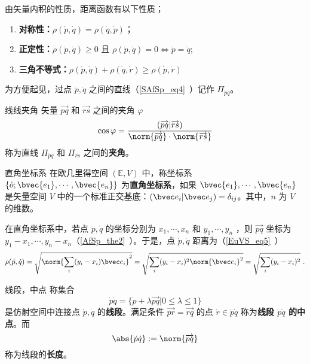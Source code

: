 由矢量内积的性质，距离函数有以下性质；
\begin{enumerate}
\item \textbf{对称性：}$\rho(\dot p,\dot q)=\rho(\dot q,\dot p)$；
\item \textbf{正定性：}$\rho(\dot p,\dot q)\geq 0$ 且 $\rho(\dot p,\dot q)= 0\Leftrightarrow\dot p=\dot q$;
\item \textbf{三角不等式：}$\rho(\dot p,\dot q)+\rho(\dot q,\dot r)\geq\rho(\dot p,\dot r)$
\end{enumerate}
为方便起见，过点 $\dot p,\dot q$ 之间的直线（\autoref{SAfSp_eq4}~）记作 $\Pi_{\dot p\dot q}$。
\begin{definition}{线线夹角}
矢量 $\overrightarrow{pq}$ 和 $\overrightarrow{rs}$ 之间的夹角 $\varphi$
\begin{equation}
\cos\varphi=\frac{(\overrightarrow{pq}|\overrightarrow{rs})}{\norm{\overrightarrow{pq}}\cdot\norm{\overrightarrow{rs}}}
\end{equation}
称为直线 $\Pi_{\dot p\dot q}$ 和 $\Pi_{\dot r\dot s}$ 之间的\textbf{夹角}。
\end{definition}
\begin{definition}{直角坐标系}
在欧几里得空间 $(\mathbb E,V)$ 中，称坐标系 $\{\dot o;\bvec{e_1},\cdots,\bvec{e_n}\}$ 为\textbf{直角坐标系}，如果 $\bvec{e_1},\cdots,\bvec{e_n}$ 是矢量空间 $V$ 中的一个标准正交基底：$(\bvec e_i|\bvec e_j)=\delta_{ij}$。其中，$n$ 为 $V$ 的维数。
\end{definition}
\begin{example}{}
在直角坐标系中，若点 $\dot p,\dot q$ 的坐标分别为 $x_1,\cdots,x_n$ 和 $y_1,\cdots,y_n$ ，则 $\overrightarrow{pq}$ 坐标为 $y_1-x_1,\cdots,y_n-x_n$（\autoref{AfSp_the2}~）。于是，点 $\dot p,\dot q$ 距离为（\autoref{EuVS_eq5}~）
\begin{equation}
\rho(\dot p,\dot q)=\sqrt{\norm{\sum_{i}(y_i-x_i)\bvec e_i}^2}=\sqrt{\sum_{i}(y_i-x_i)^2\norm{\bvec e_i}^2}=\sqrt{\sum_{i}(y_i-x_i)^2}~.
\end{equation}
\end{example}
\begin{definition}{线段，中点}
称集合
\begin{equation}
\dot p\dot q=\{\dot p+\lambda\overrightarrow{pq}|0\leq\lambda\leq1\}
\end{equation}
是仿射空间中连接点 $\dot p,\dot q$ 的\textbf{线段}。满足条件 $\overrightarrow{pr}=\overrightarrow{rq}$ 的点 $\dot r\in\dot p\dot q$ 称为\textbf{线段 $\dot p\dot q$ 的中点}。而
\begin{equation}
\abs{\dot p\dot q}:=\norm{\overrightarrow{pq}}
\end{equation}
称为线段的\textbf{长度}。
\end{definition}

